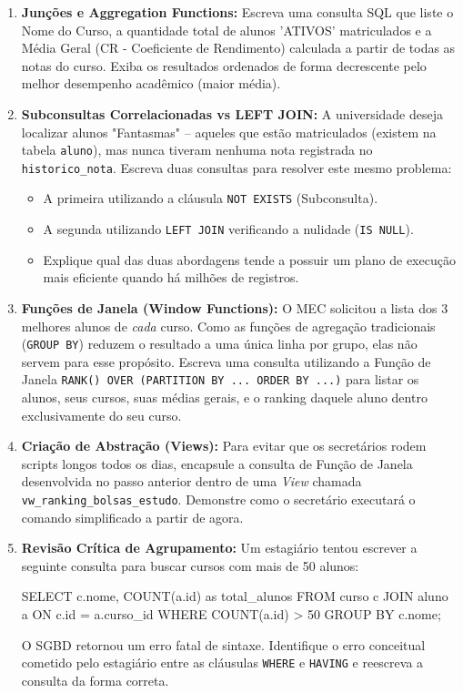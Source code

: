 \begin{enumerate}
    \item \textbf{Junções e Aggregation Functions:} Escreva uma consulta SQL que liste o Nome do Curso, a quantidade total de alunos 'ATIVOS' matriculados e a Média Geral (CR - Coeficiente de Rendimento) calculada a partir de todas as notas do curso. Exiba os resultados ordenados de forma decrescente pelo melhor desempenho acadêmico (maior média).
    \item \textbf{Subconsultas Correlacionadas vs LEFT JOIN:} A universidade deseja localizar alunos "Fantasmas" -- aqueles que estão matriculados (existem na tabela \texttt{aluno}), mas nunca tiveram nenhuma nota registrada no \texttt{historico\_nota}. Escreva duas consultas para resolver este mesmo problema:
    \begin{itemize}
        \item A primeira utilizando a cláusula \texttt{NOT EXISTS} (Subconsulta).
        \item A segunda utilizando \texttt{LEFT JOIN} verificando a nulidade (\texttt{IS NULL}).
        \item Explique qual das duas abordagens tende a possuir um plano de execução mais eficiente quando há milhões de registros.
    \end{itemize}
    \item \textbf{Funções de Janela (Window Functions):} O MEC solicitou a lista dos 3 melhores alunos de \textit{cada} curso. Como as funções de agregação tradicionais (\texttt{GROUP BY}) reduzem o resultado a uma única linha por grupo, elas não servem para esse propósito. Escreva uma consulta utilizando a Função de Janela \texttt{RANK() OVER (PARTITION BY ... ORDER BY ...)} para listar os alunos, seus cursos, suas médias gerais, e o ranking daquele aluno dentro exclusivamente do seu curso.
    \item \textbf{Criação de Abstração (Views):} Para evitar que os secretários rodem scripts longos todos os dias, encapsule a consulta de Função de Janela desenvolvida no passo anterior dentro de uma \textit{View} chamada \texttt{vw\_ranking\_bolsas\_estudo}. Demonstre como o secretário executará o comando simplificado a partir de agora.
    \item \textbf{Revisão Crítica de Agrupamento:} Um estagiário tentou escrever a seguinte consulta para buscar cursos com mais de 50 alunos:
\begin{sqlcode}
SELECT c.nome, COUNT(a.id) as total_alunos
FROM curso c
JOIN aluno a ON c.id = a.curso_id
WHERE COUNT(a.id) > 50
GROUP BY c.nome;
\end{sqlcode}
    O SGBD retornou um erro fatal de sintaxe. Identifique o erro conceitual cometido pelo estagiário entre as cláusulas \texttt{WHERE} e \texttt{HAVING} e reescreva a consulta da forma correta.
\end{enumerate}

